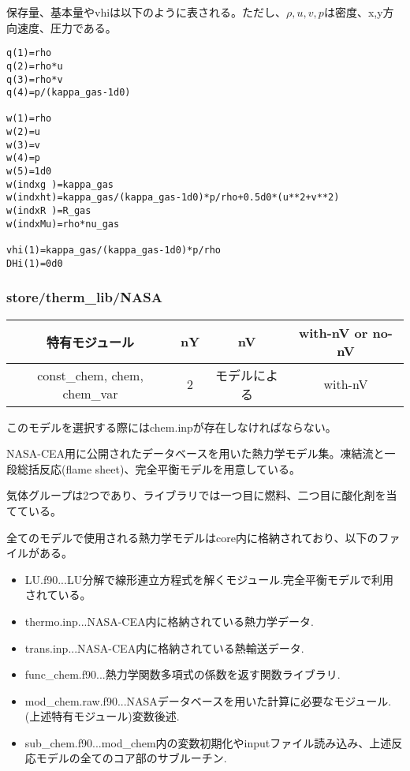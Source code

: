 \documentclass{jsarticle}
\begin{document}
保存量、基本量やvhiは以下のように表される。ただし、$\rho,u,v,p$は密度、x,y方向速度、圧力である。
\begin{verbatim}
q(1)=rho
q(2)=rho*u
q(3)=rho*v
q(4)=p/(kappa_gas-1d0)

w(1)=rho
w(2)=u
w(3)=v
w(4)=p
w(5)=1d0
w(indxg )=kappa_gas
w(indxht)=kappa_gas/(kappa_gas-1d0)*p/rho+0.5d0*(u**2+v**2)
w(indxR )=R_gas
w(indxMu)=rho*nu_gas

vhi(1)=kappa_gas/(kappa_gas-1d0)*p/rho
DHi(1)=0d0
\end{verbatim}
\subsubsection{store/therm\_lib/NASA}\label{store/therm_lib/NASA}%
\begin{center}
\begin{tabular}{cccc}\hline
特有モジュール               & nY &            nV & with-nV or no-nV\\\hline \hline
const\_chem, chem, chem\_var &  2 &  モデルによる & with-nV\\
\hline
\end{tabular}
\end{center}

このモデルを選択する際にはchem.inpが存在しなければならない。

NASA-CEA用に公開されたデータベースを用いた熱力学モデル集。凍結流と一段総括反応(flame sheet)、完全平衡モデルを用意している。

気体グループは2つであり、ライブラリでは一つ目に燃料、二つ目に酸化剤を当てている。

全てのモデルで使用される熱力学モデルはcore内に格納されており、以下のファイルがある。
\begin{itemize}
\item LU.f90...LU分解で線形連立方程式を解くモジュール.完全平衡モデルで利用されている。
\item thermo.inp...NASA-CEA内に格納されている熱力学データ.
\item trans.inp...NASA-CEA内に格納されている熱輸送データ.
\item func\_chem.f90...熱力学関数多項式の係数を返す関数ライブラリ.
\item mod\_chem.raw.f90...NASAデータベースを用いた計算に必要なモジュール.(上述特有モジュール)変数後述.
\item sub\_chem.f90...mod\_chem内の変数初期化やinputファイル読み込み、上述反応モデルの全てのコア部のサブルーチン.
\end{itemize}
\end{document}
